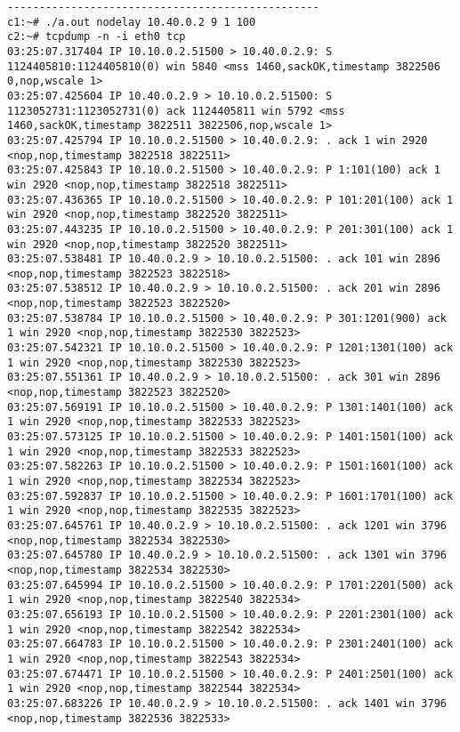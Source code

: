 \documentclass[a4paper,12pt]{article}
\begin{document}
\begin{lstlisting}
-------------------------------------------------
c1:~# ./a.out nodelay 10.40.0.2 9 1 100
c2:~# tcpdump -n -i eth0 tcp
03:25:07.317404 IP 10.10.0.2.51500 > 10.40.0.2.9: S 1124405810:1124405810(0) win 5840 <mss 1460,sackOK,timestamp 3822506 0,nop,wscale 1>
03:25:07.425604 IP 10.40.0.2.9 > 10.10.0.2.51500: S 1123052731:1123052731(0) ack 1124405811 win 5792 <mss 1460,sackOK,timestamp 3822511 3822506,nop,wscale 1>
03:25:07.425794 IP 10.10.0.2.51500 > 10.40.0.2.9: . ack 1 win 2920 <nop,nop,timestamp 3822518 3822511>
03:25:07.425843 IP 10.10.0.2.51500 > 10.40.0.2.9: P 1:101(100) ack 1 win 2920 <nop,nop,timestamp 3822518 3822511>
03:25:07.436365 IP 10.10.0.2.51500 > 10.40.0.2.9: P 101:201(100) ack 1 win 2920 <nop,nop,timestamp 3822520 3822511>
03:25:07.443235 IP 10.10.0.2.51500 > 10.40.0.2.9: P 201:301(100) ack 1 win 2920 <nop,nop,timestamp 3822520 3822511>
03:25:07.538481 IP 10.40.0.2.9 > 10.10.0.2.51500: . ack 101 win 2896 <nop,nop,timestamp 3822523 3822518>
03:25:07.538512 IP 10.40.0.2.9 > 10.10.0.2.51500: . ack 201 win 2896 <nop,nop,timestamp 3822523 3822520>
03:25:07.538784 IP 10.10.0.2.51500 > 10.40.0.2.9: P 301:1201(900) ack 1 win 2920 <nop,nop,timestamp 3822530 3822523>
03:25:07.542321 IP 10.10.0.2.51500 > 10.40.0.2.9: P 1201:1301(100) ack 1 win 2920 <nop,nop,timestamp 3822530 3822523>
03:25:07.551361 IP 10.40.0.2.9 > 10.10.0.2.51500: . ack 301 win 2896 <nop,nop,timestamp 3822523 3822520>
03:25:07.569191 IP 10.10.0.2.51500 > 10.40.0.2.9: P 1301:1401(100) ack 1 win 2920 <nop,nop,timestamp 3822533 3822523>
03:25:07.573125 IP 10.10.0.2.51500 > 10.40.0.2.9: P 1401:1501(100) ack 1 win 2920 <nop,nop,timestamp 3822533 3822523>
03:25:07.582263 IP 10.10.0.2.51500 > 10.40.0.2.9: P 1501:1601(100) ack 1 win 2920 <nop,nop,timestamp 3822534 3822523>
03:25:07.592837 IP 10.10.0.2.51500 > 10.40.0.2.9: P 1601:1701(100) ack 1 win 2920 <nop,nop,timestamp 3822535 3822523>
03:25:07.645761 IP 10.40.0.2.9 > 10.10.0.2.51500: . ack 1201 win 3796 <nop,nop,timestamp 3822534 3822530>
03:25:07.645780 IP 10.40.0.2.9 > 10.10.0.2.51500: . ack 1301 win 3796 <nop,nop,timestamp 3822534 3822530>
03:25:07.645994 IP 10.10.0.2.51500 > 10.40.0.2.9: P 1701:2201(500) ack 1 win 2920 <nop,nop,timestamp 3822540 3822534>
03:25:07.656193 IP 10.10.0.2.51500 > 10.40.0.2.9: P 2201:2301(100) ack 1 win 2920 <nop,nop,timestamp 3822542 3822534>
03:25:07.664783 IP 10.10.0.2.51500 > 10.40.0.2.9: P 2301:2401(100) ack 1 win 2920 <nop,nop,timestamp 3822543 3822534>
03:25:07.674471 IP 10.10.0.2.51500 > 10.40.0.2.9: P 2401:2501(100) ack 1 win 2920 <nop,nop,timestamp 3822544 3822534>
03:25:07.683226 IP 10.40.0.2.9 > 10.10.0.2.51500: . ack 1401 win 3796 <nop,nop,timestamp 3822536 3822533>

\end{lstlisting}
\end{document}
